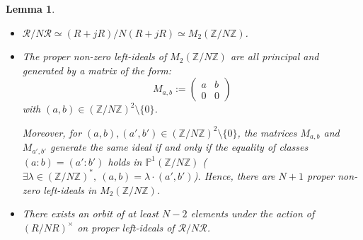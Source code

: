 \documentclass[a4paper,10pt]{report}
\theoremstyle{definition}
\theoremstyle{plain}
\newtheorem{lemma}[definition]{Lemma}
\theoremstyle{definition}
\newcommand{\Z}{\mathbb{Z}}
\newcommand{\m}[1]{\mathcal{#1}}
\renewcommand{\(}{\left(}
\renewcommand{\)}{\right)}
\renewcommand{\P}{\mathbb{P}}
\begin{document}
\begin{lemma}\label{lemma 4}
\begin{itemize}
\item[(i)] $\m{R}/N\m{R}\simeq (R+jR)/N(R+jR) \simeq M_2(\Z/N\Z)$.
\item[(ii)] The proper non-zero left-ideals of $M_2(\Z/N\Z)$ are all principal and generated by a matrix of the form:
\[M_{a,b}:=\(\begin{array}{cc}
a  & b\\ 0 & 0
\end{array}\)\]
with $(a,b)\in(\Z/N\Z)^2\setminus\{0\}$.  

Moreover, for $(a,b),(a',b')\in(\Z/N\Z)^2\setminus\{0\}$, the matrices $M_{a,b}$ and $M_{a',b'}$ generate the same ideal if and only if the equality of classes $(a:b)=(a':b')$ holds in $\P^1(\Z/N\Z)$ ($\exists \lambda\in(\Z/N\Z)^*, \ (a,b)=\lambda\cdot(a',b')$). Hence, there are $N+1$ proper non-zero left-ideals in $M_2(\Z/N\Z)$.

\item[(iii)] There exists an orbit of at least $N-2$ elements under the action of $(R/NR)^\times$ on proper left-ideals of $\m{R}/N\m{R}$.
\end{itemize}
\end{lemma}
\end{document}
